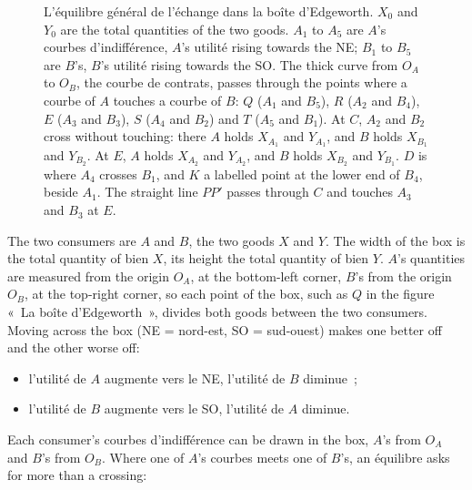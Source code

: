 \begin{figure}[h!]
  \caption*{\small L'équilibre général de l'échange dans la boîte d'Edgeworth. $X_0$ and
  $Y_0$ are the total quantities of the two goods. $A_1$ to $A_5$ are $A$'s courbes
  d'indifférence, $A$'s utilité rising towards the NE; $B_1$ to $B_5$ are $B$'s, $B$'s
  utilité rising towards the SO. The thick curve from $O_A$ to $O_B$, the courbe de
  contrats, passes through the points where a courbe of $A$ touches a courbe of $B$:
  $Q$ ($A_1$ and $B_5$), $R$ ($A_2$ and $B_4$), $E$ ($A_3$ and $B_3$), $S$ ($A_4$
  and $B_2$) and $T$ ($A_5$ and $B_1$). At $C$, $A_2$ and $B_2$ cross without
  touching: there $A$ holds $X_{A_1}$ and $Y_{A_1}$, and $B$ holds $X_{B_1}$ and
  $Y_{B_2}$. At $E$, $A$ holds $X_{A_2}$ and $Y_{A_2}$, and $B$ holds $X_{B_2}$ and
  $Y_{B_1}$. $D$ is where $A_4$ crosses $B_1$, and $K$ a labelled
  point at the lower end of $B_4$, beside $A_1$. The straight line $PP'$ passes
  through $C$ and touches $A_3$ and $B_3$ at $E$.}
\end{figure}

The two consumers are $A$ and $B$, the two goods $X$ and $Y$. The width of the box
is the total quantity of bien $X$, its height the total quantity of bien $Y$. $A$'s
quantities are measured from the origin $O_A$, at the bottom-left corner, $B$'s from
the origin $O_B$, at the top-right corner, so each point of the box, such as $Q$ in
the figure «~La boîte d'Edgeworth~», divides both goods between the two consumers.
Moving across the box (NE = nord-est, SO = sud-ouest) makes one better off and the
other worse off:
\begin{itemize}
  \item l'utilité de $A$ augmente vers le NE, l'utilité de $B$ diminue~;
  \item l'utilité de $B$ augmente vers le SO, l'utilité de $A$ diminue.
\end{itemize}

Each consumer's courbes d'indifférence can be drawn in the box, $A$'s from $O_A$ and
$B$'s from $O_B$. Where one of $A$'s courbes meets one of $B$'s, an équilibre asks
for more than a crossing:

